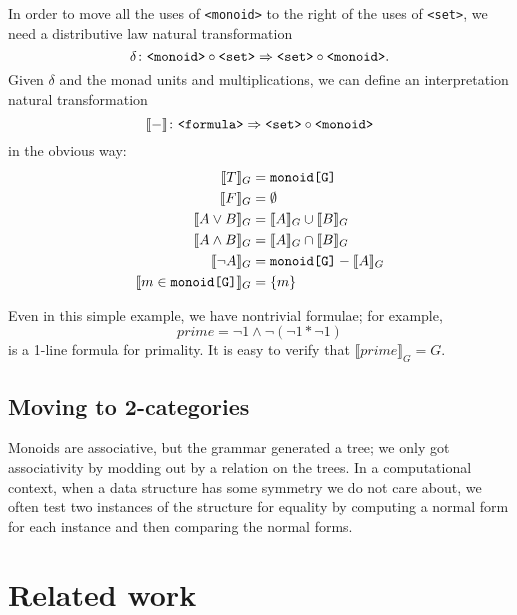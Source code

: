 \documentclass{article}
\newcommand{\interp}[1]{\llbracket #1 \rrbracket}
\newcommand{\maps}{\colon}
\newcommand{\gram}[1]{\mbox{\tt <#1>}}
\begin{document}
In order to move all the uses of {\tt <monoid>} to the right of the uses of {\tt <set>}, we need a distributive law natural transformation
\[ \delta\maps \gram{monoid}\circ\gram{set} \Rightarrow \gram{set}\circ\gram{monoid}. \]
Given $\delta$ and the monad units and multiplications, we can define an interpretation natural transformation
\[ \interp{-}\maps \gram{formula}\Rightarrow\gram{set}\circ\gram{monoid} \]
in the obvious way:
\begin{align*}
  \interp{T}_G &= \mbox{\tt monoid[G]}\\
  \interp{F}_G &= \emptyset\\
  \interp{{A}\lor{B}}_G &= \interp{A}_G \cup \interp{B}_G\\
  \interp{{A}\land{B}}_G &= \interp{A}_G \cap \interp{B}_G\\
  \interp{\neg A}_G &= \mbox{\tt monoid[G]} - \interp{A}_G\\
  \interp{m \in \mbox{\tt monoid[G]}}_G &= \{m\}
\end{align*}

Even in this simple example, we have nontrivial formulae; for example,
\[ prime = \neg 1 \land \neg(\neg 1 * \neg 1) \]
is a 1-line formula for primality.  It is easy to verify that $\interp{prime}_G = G.$

\subsection{Moving to 2-categories}

Monoids are associative, but the grammar generated a tree; we only got associativity by modding out by a relation on the trees.  In a computational context, when a data structure has some symmetry we do not care about, we often test two instances of the structure for equality by computing a normal form for each instance and then comparing the normal forms.



\section{Related work}
\end{document}
